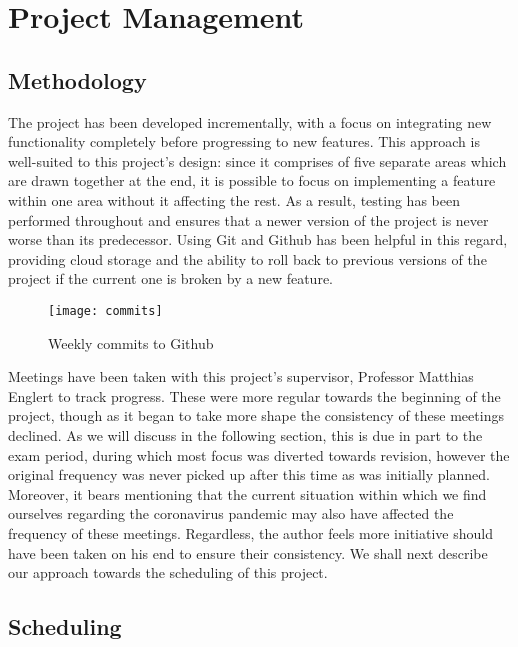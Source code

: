 \section{Project Management}

\label{sec:projectManagement}

\subsection{Methodology}

The project has been developed incrementally, with a focus on integrating new
functionality completely before progressing to new features. This approach is
well-suited to this project's design: since it comprises of five separate areas
which are drawn together at the end, it is possible to focus on implementing a
feature within one area without it affecting the rest. As a result, testing has
been performed throughout and ensures that a newer version of the project is
never worse than its predecessor. Using Git and Github has been helpful in this
regard, providing cloud storage and the ability to roll back to previous
versions of the project if the current one is broken by a new feature.

\begin{figure}[h]
	\centering
	\texttt{[image: commits]}
	\caption{Weekly commits to Github}
	\label{fig:commits}
\end{figure}

Meetings have been taken with this project's supervisor, Professor Matthias
Englert to track progress. These were more regular towards the beginning of the
project, though as it began to take more shape the consistency of these
meetings declined. As we will discuss in the following section, this is due in
part to the exam period, during which most focus was diverted towards revision,
however the original frequency was never picked up after this time as was
initially planned. Moreover, it bears mentioning that the current situation
within which we find ourselves regarding the coronavirus pandemic may also have
affected the frequency of these meetings. Regardless, the author feels more
initiative should have been taken on his end to ensure their consistency. We
shall next describe our approach towards the scheduling of this project.

\subsection{Scheduling}

